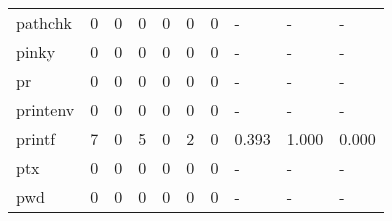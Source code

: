 \begin{longtable}{lp{2.0cm}p{2.0cm}p{2.0cm}p{2.0cm}p{2.0cm}p{2.0cm}p{2.0cm}p{2.0cm}p{2.0cm}}
pathchk   &                      0 &                                             0 &                                            0 &                                           0 &                                            0 &                                          0 &                                    - &                                      - &                                    - \\
pinky     &                      0 &                                             0 &                                            0 &                                           0 &                                            0 &                                          0 &                                    - &                                      - &                                    - \\
pr        &                      0 &                                             0 &                                            0 &                                           0 &                                            0 &                                          0 &                                    - &                                      - &                                    - \\
printenv  &                      0 &                                             0 &                                            0 &                                           0 &                                            0 &                                          0 &                                    - &                                      - &                                    - \\
printf    &                      7 &                                             0 &                                            5 &                                           0 &                                            2 &                                          0 &                                0.393 &                                  1.000 &                                0.000 \\
ptx       &                      0 &                                             0 &                                            0 &                                           0 &                                            0 &                                          0 &                                    - &                                      - &                                    - \\
pwd       &                      0 &                                             0 &                                            0 &                                           0 &                                            0 &                                          0 &                                    - &                                      - &                                    - \\

\end{longtable}
